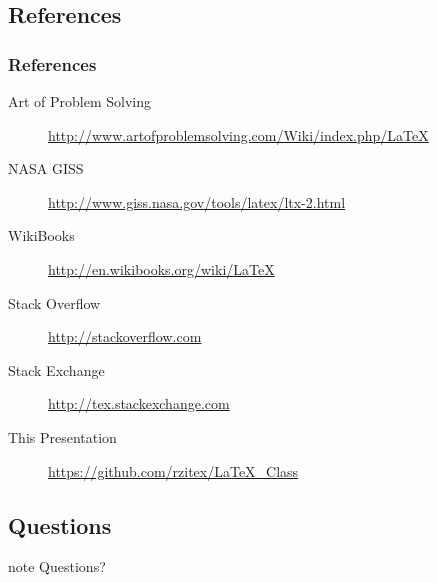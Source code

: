 \subsection{References}
\begin{frame}
\frametitle{References}
\begin{description}
    \item[Art of Problem Solving] \url{http://www.artofproblemsolving.com/Wiki/index.php/LaTeX}
    \item[NASA GISS] \url{http://www.giss.nasa.gov/tools/latex/ltx-2.html}
    \item[WikiBooks] \url{http://en.wikibooks.org/wiki/LaTeX}
    \item[Stack Overflow] \url{http://stackoverflow.com}
    \item[Stack Exchange] \url{http://tex.stackexchange.com}
    \item[This Presentation] \url{https://github.com/rzitex/LaTeX\_Class}
\end{description}
\end{frame}

\subsection{Questions}
\begin{frame}
\begin{beamercolorbox}[center,shadow=true,rounded=true,]{note}
        Questions?
\end{beamercolorbox}
\end{frame} 
